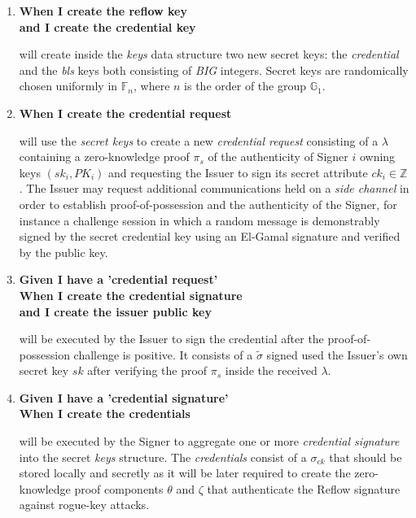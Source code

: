\documentclass[twocolumn]{article}
\begin{document}
\begin{enumerate}

\item \textbf{When I create the reflow key}
  \\ \textbf{and I create the credential key}

  will create inside the \emph{keys} data structure two new secret
  keys: the \emph{credential} and the \emph{bls} keys both consisting
  of \emph{BIG} integers. Secret keys are randomically chosen
  uniformly in $\mathbb{F}_n$, where $n$ is the order of the group
  $\mathbb{G}_1$.

\item \textbf{When I create the credential request}

  will use the \emph{secret keys} to create a new \emph{credential
    request} consisting of a $\lambda$ containing a zero-knowledge
  proof $\pi_s$ of the authenticity of Signer $i$ owning keys
  $(sk_i, PK_i)$ and requesting the Issuer to sign its secret
  attribute $ck_i\in\mathbb{Z}$. The Issuer may request additional
  communications held on a \emph{side channel} in order to establish
  proof-of-possession and the authenticity of the Signer, for instance
  a challenge session in which a random message is demonstrably signed
  by the secret credential key using an El-Gamal signature
  \citep{elgamal} and verified by the public key.

\item \textbf{Given I have a 'credential request'}
 \\ \textbf{When I create the credential signature}
 \\ \textbf{and I create the issuer public key}

  will be executed by the Issuer to sign the credential after the
  proof-of-possession challenge is positive. It consists of a
  $\tilde{\sigma}$ signed used the Issuer's own secret key $sk$ after
  verifying the proof $\pi_s$ inside the received $\lambda$.

\item \textbf{Given I have a 'credential signature'}
 \\ \textbf{When I create the credentials}

 will be executed by the Signer to aggregate one or more
 \emph{credential signature} into the secret \emph{keys} structure.
 The \emph{credentials} consist of a $\sigma_{ck}$ that should be
 stored locally and secretly as it will be later required to create
 the zero-knowledge proof components $\theta$ and $\zeta$ that
 authenticate the Reflow signature against rogue-key attacks.
\end{enumerate}
\end{document}
